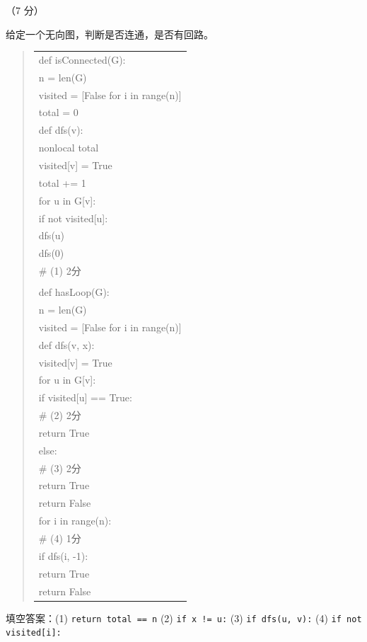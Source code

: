 \begin{question}[无向图连通性与回路判定]（7 分）

给定一个无向图，判断是否连通，是否有回路。

\begin{quote}
\footnotesize
\begin{tabular}{@{}l@{}}
def isConnected(G):\\
    n = len(G)\\
    visited = [False for i in range(n)]\\
    total = 0\\
    def dfs(v):\\
        nonlocal total\\
        visited[v] = True\\
        total += 1\\
        for u in G[v]:\\
            if not visited[u]:\\
                dfs(u)\\
    dfs(0)\\
\underline{\hspace{12em}} \# (1) 2分\\
\\
def hasLoop(G):\\
    n = len(G)\\
    visited = [False for i in range(n)]\\
    def dfs(v, x):\\
        visited[v] = True\\
        for u in G[v]:\\
            if visited[u] == True:\\
\underline{\hspace{12em}} \# (2) 2分\\
                    return True\\
            else:\\
\underline{\hspace{12em}} \# (3) 2分\\
                    return True\\
        return False\\
    for i in range(n):\\
\underline{\hspace{12em}} \# (4) 1分\\
            if dfs(i, -1):\\
                return True\\
    return False\\
\end{tabular}
\end{quote}

\begin{solution}
填空答案：(1) \texttt{return total == n} (2) \texttt{if x != u:} (3) \texttt{if dfs(u, v):} (4) \texttt{if not visited[i]:}
\end{solution}
\end{question}

